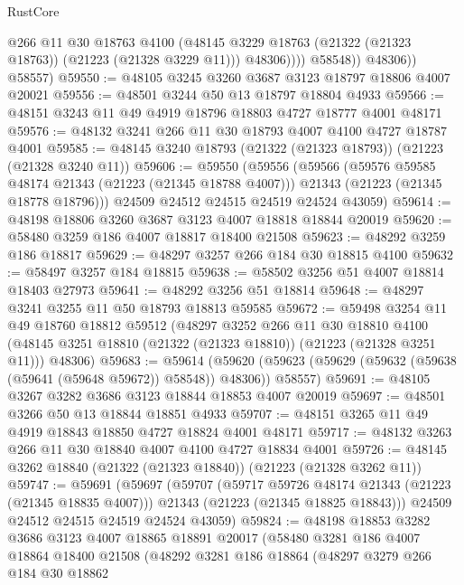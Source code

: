 \begin{lexlean}{RustCore}
\begin{coremodule}
                      @266
                      @11
                      @30
                      @18763
                      @4100
                      (@48145 @3229 @18763 (@21322 (@21323 @18763)) (@21223 (@21328 @3229 @11)))
                      @48306))))
              @58548))
          @48306))
      @58557)
@59550 := @48105 @3245 @3260 @3687 @3123 @18797 @18806 @4007 @20021
@59556 := @48501 @3244 @50 @13 @18797 @18804 @4933
@59566 := @48151 @3243 @11 @49 @4919 @18796 @18803 @4727 @18777 @4001 @48171
@59576 := @48132 @3241 @266 @11 @30 @18793 @4007 @4100 @4727 @18787 @4001
@59585 := @48145 @3240 @18793 (@21322 (@21323 @18793)) (@21223 (@21328 @3240 @11))
@59606 := @59550
    (@59556
      (@59566
        (@59576 @59585 @48174 @21343 (@21223 (@21345 @18788 @4007)))
        @21343
        (@21223 (@21345 @18778 @18796)))
      @24509
      @24512
      @24515
      @24519
      @24524
      @43059)
@59614 := @48198 @18806 @3260 @3687 @3123 @4007 @18818 @18844 @20019
@59620 := @58480 @3259 @186 @4007 @18817 @18400 @21508
@59623 := @48292 @3259 @186 @18817
@59629 := @48297 @3257 @266 @184 @30 @18815 @4100
@59632 := @58497 @3257 @184 @18815
@59638 := @58502 @3256 @51 @4007 @18814 @18403 @27973
@59641 := @48292 @3256 @51 @18814
@59648 := @48297 @3241 @3255 @11 @50 @18793 @18813 @59585
@59672 := @59498
    @3254
    @11
    @49
    @18760
    @18812
    @59512
    (@48297
      @3252
      @266
      @11
      @30
      @18810
      @4100
      (@48145 @3251 @18810 (@21322 (@21323 @18810)) (@21223 (@21328 @3251 @11)))
      @48306)
@59683 := @59614
    (@59620 (@59623 (@59629 (@59632 (@59638 (@59641 (@59648 @59672)) @58548)) @48306)) @58557)
@59691 := @48105 @3267 @3282 @3686 @3123 @18844 @18853 @4007 @20019
@59697 := @48501 @3266 @50 @13 @18844 @18851 @4933
@59707 := @48151 @3265 @11 @49 @4919 @18843 @18850 @4727 @18824 @4001 @48171
@59717 := @48132 @3263 @266 @11 @30 @18840 @4007 @4100 @4727 @18834 @4001
@59726 := @48145 @3262 @18840 (@21322 (@21323 @18840)) (@21223 (@21328 @3262 @11))
@59747 := @59691
    (@59697
      (@59707
        (@59717 @59726 @48174 @21343 (@21223 (@21345 @18835 @4007)))
        @21343
        (@21223 (@21345 @18825 @18843)))
      @24509
      @24512
      @24515
      @24519
      @24524
      @43059)
@59824 := @48198
    @18853
    @3282
    @3686
    @3123
    @4007
    @18865
    @18891
    @20017
    (@58480
      @3281
      @186
      @4007
      @18864
      @18400
      @21508
      (@48292
        @3281
        @186
        @18864
        (@48297
          @3279
          @266
          @184
          @30
          @18862

\end{coremodule}
\end{lexlean}
